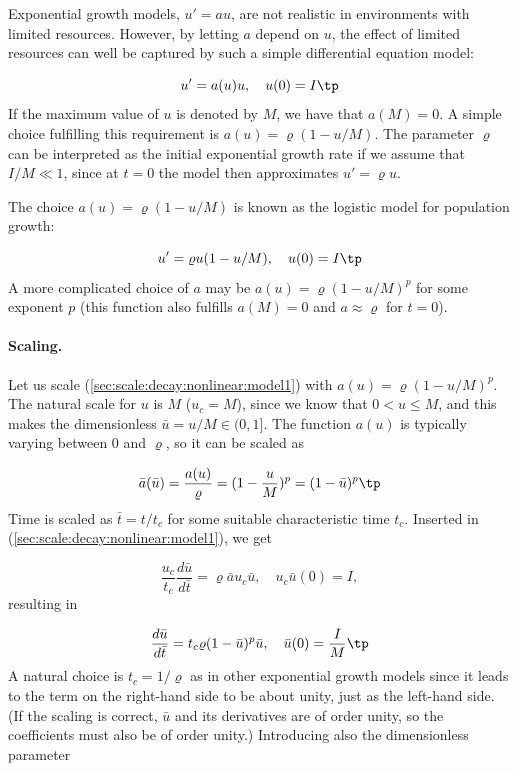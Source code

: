 \documentclass[graybox,envcountchap,sectrefs,final]{svmonodo}
\begin{document}

Exponential growth models, $u'=au$, are not realistic in environments
with limited resources. However, by letting $a$ depend on $u$, the effect
of limited resources can well be captured by such a simple differential
equation model:

\begin{equation}
u' = a(u)u,\quad u(0)=I\tp
\label{sec:scale:decay:nonlinear:model1}
\end{equation}
If the maximum value of $u$ is denoted by $M$, we have that $a(M)=0$.
A simple choice fulfilling this requirement is $a(u)=\varrho(1-u/M)$.
The parameter $\varrho$ can be interpreted as the initial exponential
growth rate if we assume that $I/M\ll 1$, since at $t=0$ the model then
approximates $u'=\varrho u$.

The choice $a(u)=\varrho(1-u/M)$ is known as the logistic model for
population growth:

\begin{equation}
u' = \varrho u(1-u/M),\quad u(0)=I\tp
\label{sec:scale:decay:nonlinear:model2}
\end{equation}
A more complicated choice of $a$ may be $a(u)=\varrho(1-u/M)^p$ for
some exponent $p$ (this function also fulfills $a(M)=0$ and $a\approx\varrho$
for $t=0$).


\paragraph{Scaling.}
Let us scale (\ref{sec:scale:decay:nonlinear:model1}) with
$a(u)=\varrho (1-u/M)^p$.
The natural scale for $u$ is $M$ ($u_c=M$), since we know that
$0 < u\leq M$, and this makes the dimensionless $\bar u = u/M \in (0,1]$.
The function $a(u)$ is
typically varying between 0 and $\varrho$, so it can be scaled as

\[ \bar a(\bar u) = \frac{a(u)}{\varrho} = (1 - \frac{u}{M})^p =
(1 - \bar u)^p\tp\]
Time is scaled as $\bar t = t/t_c$ for some suitable characteristic time $t_c$.
Inserted in (\ref{sec:scale:decay:nonlinear:model1}), we get

\[ \frac{u_c}{t_c}\frac{d\bar u}{d\bar t} = \varrho\bar a u_c\bar u,\quad u_c\bar u(0)=I,\]
resulting in

\[ \frac{d\bar u}{d\bar t} = t_c \varrho (1 - \bar u)^p \bar u,\quad
\bar u(0) =\frac{I}{M}\tp\]
A natural choice is $t_c =1/\varrho$ as in other exponential growth models
since it leads to the term on the right-hand side to be about unity,
just as the left-hand side. (If the scaling is correct, $\bar u$ and its
derivatives are of order unity, so the coefficients must also be of order
unity.) Introducing also the dimensionless parameter
\end{document}
